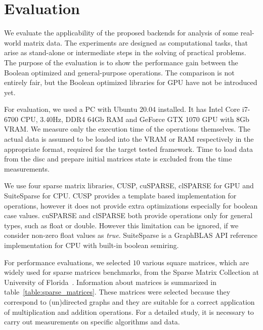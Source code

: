 \section{Evaluation}



We evaluate the applicability of the proposed backends for analysis of some real-world matrix data.
The experiments are designed as computational tasks, that arise as stand-alone or intermediate steps in the solving of practical problems. 
The purpose of the evaluation is to show the performance gain between the Boolean optimized and general-purpose operations. 
The comparison is not entirely fair, but the Boolean optimized libraries for GPU have not be introduced yet.


For evaluation, we used a PC with Ubuntu 20.04 installed.
It has Intel Core i7-6700 CPU, 3.40Hz, DDR4 64Gb RAM and GeForce GTX 1070 GPU with 8Gb VRAM.
We measure only the execution time of the operations themselves.
The actual data is assumed to be loaded into the VRAM or RAM respectively in the appropriate format, required for the target tested framework.
Time to load data from the disc and prepare initial matrices state is excluded from the time measurements.

We use four sparse matrix libraries, CUSP, cuSPARSE, clSPARSE for GPU and SuiteSparse for CPU.
CUSP provides a template based implementation for operations, however it does not provide extra optimizations especially for boolean case values. cuSPARSE and clSPARSE both provide operations only for general types, such as float or double.
However this limitation can be ignored, if we consider non-zero float values as \textit{true}.
SuiteSparse is a GraphBLAS API reference implementation for CPU with built-in boolean semiring.

For performance evaluations, we selected $10$ various square matrices, which are widely used for sparse matrices benchmarks, from the Sparse Matrix Collection at University of Florida~\cite{data:suitesparse_matrix_collection}.
Information about matrices is summarized in table~\ref{table:sparse_matrices}.
These matrices were selected because they correspond to (un)directed graphs 
and they are suitable for a correct application of multiplication and addition operations. 
For a detailed study, it is necessary to carry out measurements on specific algorithms and data. 

